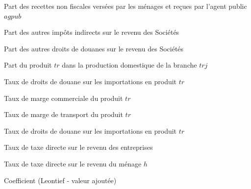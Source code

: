 \documentclass[11pt,a4paper]{article}
\newcommand{\trj}{\mathit{trj}}
\newcommand{\agpub}{\mathit{agpub}}
\newcommand{\bns}{\mathit{bns}}
\newcommand{\sntx}{\mathit{sntx}}
\newcommand{\syfi}{\mathit{syfi}}
\newcommand{\syfm}{\mathit{syfm}}
\newcommand{\tr}{\mathit{tr}}
\newcommand{\tx}{\mathit{tx}}
\newcommand{\tm}{\mathit{tm}}
\newcommand{\tmgc}{\mathit{tmgc}}
\newcommand{\tmgt}{\mathit{tmgt}}
\newcommand{\tyh}{\mathit{tyh}}
\newcommand{\tyf}{\mathit{tyf}}
\begin{document}
\begin{description}[leftmargin=!,labelwidth=\widthof{\bfseries AAAAA},parsep=10pt]
		\item[$\sntx_{\agpub}$] Part des recettes non fiscales versées par les ménages et reçues par l'agent public $\agpub$
		
		\item[$\syfi$] Part des autres impôts indirects sur le revenu des Sociétés 
		
		\item[$\syfm$] Part des autres droits de douanes sur le revenu des Sociétés 
		
		\item[$\theta_{\tr,\trj}$] Part du produit $\tr$ dans la production domestique de la branche $\trj$
		
		\item[$\tm_{\tr}$] Taux de droits de douane sur les importations en produit $\tr$
		
		\item[$\tmgc_{\bns}$] Taux de marge commerciale du produit $\tr$
		
		\item[$\tmgt_{\bns}$] Taux de marge de transport du produit $\tr$
		
		\item[$\tx_{\tr}$] Taux de droits de douane sur les importations en produit $\tr$
		
		\item[$\tyf$] Taux de taxe directe sur le revenu des entreprises 
		
		\item[$\tyh_h$] Taux de taxe directe sur le revenu du ménage $h$
		
		\item[$v_j$] Coefficient (Leontief - valeur ajoutée)
		
		
	\end{description}
	
	
\end{document}
